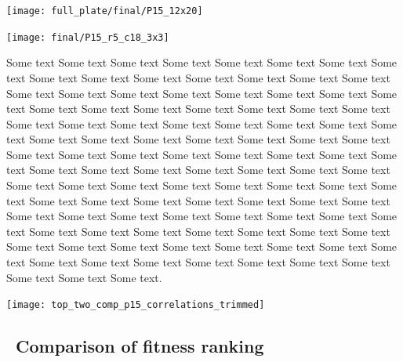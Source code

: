\begin{landscape}
\graphicspath{{images/comp_fit/}}
\begin{Figure}
  \centering
  \texttt{[image: full\_plate/final/P15\_12x20]}
  \label{fig:comp_fit_plate}
\end{Figure}
\end{landscape}
\begin{multicols}{2}

\end{multicols}
\graphicspath{{images/comp_fit/}}
\begin{Figure}
  \centering
  \texttt{[image: final/P15\_r5\_c18\_3x3]}
  \label{fig:comp_fit_zone}
\end{Figure}
\begin{multicols}{2}

  Some text Some text Some text Some text Some text Some text Some
  text Some text Some text Some text Some text Some text Some text
  Some text Some text Some text Some text Some text Some text Some
  text Some text Some text Some text Some text Some text Some text
  Some text Some text Some text Some text Some text Some text Some
  text Some text Some text Some text Some text Some text Some text
  Some text Some text Some text Some text Some text Some text Some
  text Some text Some text Some text Some text Some text Some text
  Some text Some text Some text Some text Some text Some text Some
  text Some text Some text Some text Some text Some text Some text
  Some text Some text Some text Some text Some text Some text Some
  text Some text Some text Some text Some text Some text Some text
  Some text Some text Some text Some text Some text Some text Some
  text Some text Some text Some text Some text Some text Some text
  Some text Some text Some text Some text Some text Some text Some
  text Some text Some text Some text Some text Some text Some text
  Some text Some text Some text Some text.

\graphicspath{{images/correlation/}}
\begin{Figure}
  \centering
  \texttt{[image: top\_two\_comp\_p15\_correlations\_trimmed]}
  \label{fig:comp_b_ranking}
\end{Figure}

\subsection{\thesubsection~Comparison of fitness ranking}


\end{multicols}
